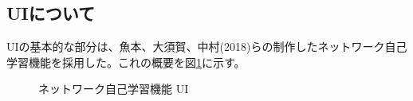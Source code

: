 \subsection{UIについて}
\label{tag:ui}
UIの基本的な部分は、魚本、大須賀、中村(2018)らの制作したネットワーク自己学習機能を採用した。これの概要を図\ref{fig:simu}に示す。

\begin{figure}[htbp]
  \begin{center}
    \caption{ネットワーク自己学習機能 UI}
    \label{fig:simu}
  \end{center}
\end{figure}

